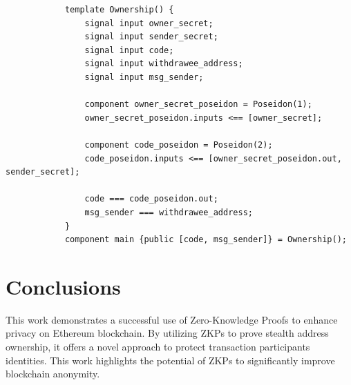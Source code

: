 \documentclass[portrait]{poster}
\begin{document}
\begin{multicols}{2}
\begin{center}
\begin{verbatim}
            template Ownership() {
                signal input owner_secret;
                signal input sender_secret;
                signal input code;
                signal input withdrawee_address;
                signal input msg_sender;

                component owner_secret_poseidon = Poseidon(1);
                owner_secret_poseidon.inputs <== [owner_secret];

                component code_poseidon = Poseidon(2);
                code_poseidon.inputs <== [owner_secret_poseidon.out, sender_secret];

                code === code_poseidon.out;
                msg_sender === withdrawee_address;
            }
            component main {public [code, msg_sender]} = Ownership();
        \end{verbatim}
        \label{fig:circuit}
    \end{center}\vspace{1cm}

\section*{Conclusions}

    This work demonstrates a successful use of Zero-Knowledge Proofs
    to enhance privacy on Ethereum blockchain. By
    utilizing ZKPs to prove stealth address ownership, it offers a novel
    approach to protect transaction participants identities. This work
    highlights the potential of ZKPs to significantly improve
    blockchain anonymity.





\end{multicols}
\end{document}
